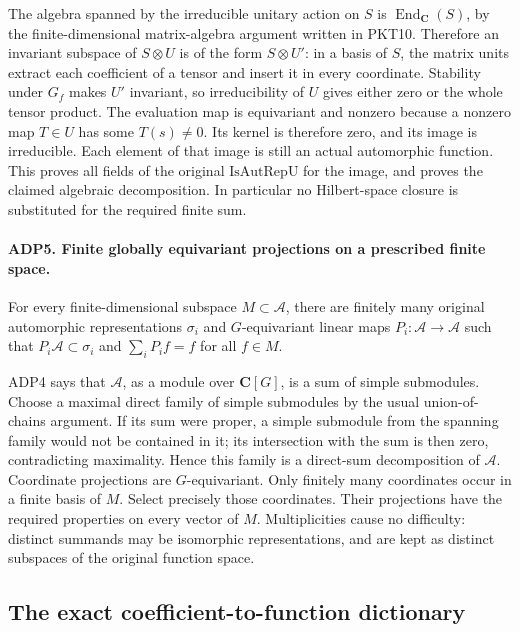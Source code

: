 The algebra spanned by the irreducible unitary action on \(S\) is
\(\operatorname{End}_{\mathbf C}(S)\), by the finite-dimensional
matrix-algebra argument written in PKT10.  Therefore an invariant
subspace of \(S\otimes U\) is of the form \(S\otimes U'\): in a
basis of \(S\), the matrix units extract each coefficient of a tensor
and insert it in every coordinate.  Stability under \(G_f\) makes
\(U'\) invariant, so irreducibility of \(U\) gives either zero or the
whole tensor product.  The evaluation map is equivariant and nonzero
because a nonzero map \(T\in U\) has some \(T(s)\ne0\).  Its kernel
is therefore zero, and its image is irreducible.  Each element of that
image is still an actual automorphic function.  This proves all fields
of the original \(\mathrm{IsAutRepU}\) for the image, and proves the
claimed algebraic decomposition.  In particular no Hilbert-space closure
is substituted for the required finite sum.

\paragraph{ADP5. Finite globally equivariant projections on a prescribed finite space.}
\label{claim:ADP5}
For every finite-dimensional subspace \(M\subset\mathcal A\), there
are finitely many original automorphic representations \(\sigma_i\)
and \(G\)-equivariant linear maps \(P_i:\mathcal A\to\mathcal A\)
such that \(P_i\mathcal A\subset\sigma_i\) and
\(\sum_iP_i f=f\) for all \(f\in M\).

ADP4 says that \(\mathcal A\), as a module over \(\mathbf C[G]\),
is a sum of simple submodules.  Choose a maximal direct family of simple
submodules by the usual union-of-chains argument.  If its sum were
proper, a simple submodule from the spanning family would not be
contained in it; its intersection with the sum is then zero, contradicting
maximality.  Hence this family is a direct-sum decomposition of
\(\mathcal A\).  Coordinate projections are \(G\)-equivariant.
Only finitely many coordinates occur in a finite basis of \(M\).
Select precisely those coordinates.  Their projections have the required
properties on every vector of \(M\).  Multiplicities cause no difficulty:
distinct summands may be isomorphic representations, and are kept as
distinct subspaces of the original function space.

\subsection{The exact coefficient-to-function dictionary}

